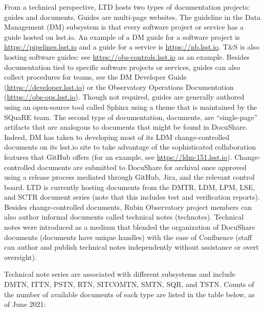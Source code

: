 From a technical perspective, LTD hosts two types of documentation projects: guides and documents.
Guides are multi-page websites.
The guideline in the Data Management (DM) subsystem is that every software project or service has a guide hosted on lsst.io.
An example of a DM guide for a software project is \url{https://pipelines.lsst.io} and a guide for a service is \url{https://nb.lsst.io}.
T\&S is also hosting software guides: see \url{https://obs-controls.lsst.io} as an example.
Besides documentation tied to specific software projects or services, guides can also collect procedures for teams, see the DM Developer Guide (\url{https://developer.lsst.io}) or the Observatory Operations Documentation (\url{https://obs-ops.lsst.io}).
Though not required, guides are generally authored using an open-source tool called Sphinx \citep{Sphinx-cite} using a theme that is maintained by the SQuaRE team.
The second type of documentation, documents, are ``single-page'' artifacts that are analogous to documents that might be found in DocuShare.
Indeed, DM has taken to developing most of its LDM change-controlled documents on its lsst.io site to take advantage of the sophisticated collaboration features that GitHub offers (for an example, see \url{https://ldm-151.lsst.io}). \citep{GitHub-cite}
Change-controlled documents are submitted to DocuShare for archival once approved using a release process mediated through GitHub, Jira, and the relevant control board.
LTD is currently hosting documents from the DMTR, LDM, LPM, LSE, and SCTR document series (note that this includes test and verification reports).
Besides change-controlled documents, Rubin Observatory project members can also author informal documents called technical notes (technotes).
Technical notes were introduced as a medium that blended the organization of DocuShare documents (documents have unique handles) with the ease of Confluence (staff can author and publish technical notes independently without assistance or overt oversight). 

Technical note series are associated with different subsystems and include DMTN, ITTN, PSTN, RTN, SITCOMTN, SMTN, SQR, and TSTN.
Counts of the number of available documents of each type are listed in the table below, as of June 2021:

